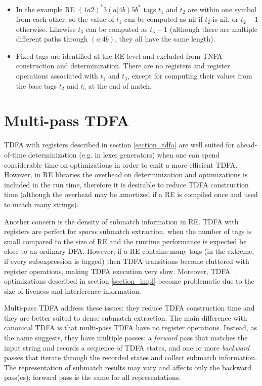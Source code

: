 \documentclass[]{article}
\begin{document}
\begin{itemize}

\item[\ding{212}]
In the example RE $(1a2)^*3(a|4b)5b^*$ tags $t_1$ and $t_2$ are within one symbol from each other,
so the value of $t_1$ can be computed as nil if $t_2$ is nil, or $t_2 - 1$ otherwise.
Likewise $t_3$ can be computed as $t_5 - 1$ (although there are multiple different paths through $(a|4b)$, they all have the same length).
\medskip

\item[\ding{212}]
Fixed tags are identified at the RE level and excluded from TNFA construction and determinization.
There are no registers and register operations associated with $t_1$ and $t_3$,
except for computing their values from the base tags $t_2$ and $t_5$ at the end of match.
\medskip

\end{itemize}

\FloatBarrier

\section{Multi-pass TDFA}\label{section_multipass}

TDFA with registers described in section \ref{section_tdfa}
are well suited for ahead-of-time determinization (e.g. in lexer generators)
when one can spend considerable time on optimizations in order to emit a more efficient TDFA.
However, in RE libraries the overhead on determinization and optimizations is included in the run time,
therefore it is desirable to reduce TDFA construction time
(although the overhead may be amortized if a RE is compiled once and used to match many strings).
\medskip

Another concern is the density of submatch information in RE.
TDFA with registers are perfect for \emph{sparse} submatch extraction,
when the number of tags is small compared to the size of RE
and the runtime performance is expected be close to an ordinary DFA.
However, if a RE contains many tags (in the extreme, if every subexpression is tagged)
then TDFA transitions become cluttered with register operations,
making TDFA execution very slow.
Moreover, TDFA optimizations described in section \ref{section_impl} become problematic
due to the size of liveness and interference information.
\medskip

Multi-pass TDFA address these issues:
they reduce TDFA construction time and they are better suited to dense submatch extraction.
The main difference with canonical TDFA is that multi-pass TDFA have no register operations.
Instead, as the name suggests, they have multiple passes:
a \emph{forward} pass that matches the input string and records a sequence of TDFA states,
and one or more \emph{backward} passes that iterate through the recorded states and collect submatch information.
The representation of submatch results may vary and affects only the backward pass(es);
forward pass is the same for all representations.
\medskip
\end{document}
